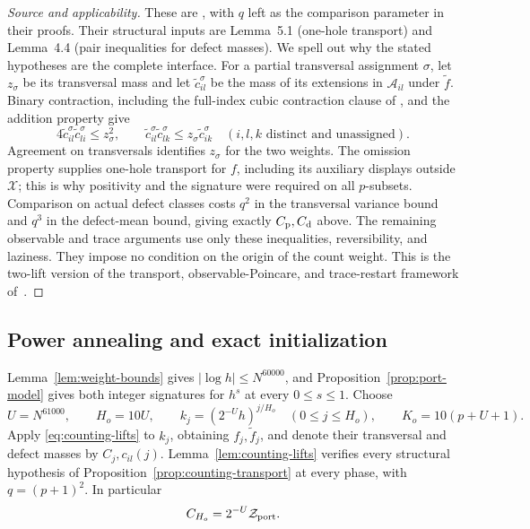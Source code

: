 \begin{proof}[Source and applicability]
These are \cite[Propositions~5.2 and~5.4 and Lemmas~5.5--5.6]{CB},
with $q$ left as the comparison parameter in their proofs.  Their
structural inputs are Lemma~5.1 (one-hole transport) and Lemma~4.4
(pair inequalities for defect masses).  We spell out why the stated
hypotheses are the complete interface.  For a partial transversal
assignment $\sigma$, let $z_\sigma$ be its transversal mass and let
$\widetilde c_{il}^{\sigma}$ be the mass of its extensions in
$\mathcal A_{il}$ under $\widetilde f$.  Binary contraction, including
the full-index cubic contraction clause of \cite[Lemma~4.1]{CB},
and the addition property give
\[
 4\widetilde c_{il}^{\sigma}\widetilde c_{li}^{\sigma}\leq z_\sigma^2,
 \qquad
 \widetilde c_{il}^{\sigma}\widetilde c_{lk}^{\sigma}
       \leq z_\sigma\widetilde c_{ik}^{\sigma}
 \quad(i,l,k\text{ distinct and unassigned}).
\]
Agreement on transversals identifies $z_\sigma$ for the two weights.
The omission property supplies one-hole transport for $f$, including
its auxiliary displays outside $\mathcal X$; this is why positivity
and the signature were required on all $p$-subsets.
Comparison on actual defect classes costs $q^2$ in the transversal
variance bound and $q^3$ in the defect-mean bound, giving exactly
$C_{\rm p},C_{\rm d}$ above.  The remaining observable and trace
arguments use only these inequalities, reversibility, and laziness.
They impose no condition on the origin of the count weight.
This is the two-lift version of the transport, observable-Poincare,
and trace-restart framework of~\cite[Sections~4--6]{Parent}.
\end{proof}

\subsection{Power annealing and exact initialization}

Lemma~\ref{lem:weight-bounds} gives $|\log h|\leq N^{60000}$, and
Proposition~\ref{prop:port-model} gives both integer signatures for
$h^s$ at every $0\leq s\leq1$.
Choose
\begin{equation}
 U=N^{61000},\qquad H_o=10U,\qquad
 k_j=(2^{-U}h)^{j/H_o}\quad(0\leq j\leq H_o),
 \qquad K_o=10(p+U+1).
 \label{eq:counting-schedule}
\end{equation}
Apply \eqref{eq:counting-lifts} to $k_j$, obtaining $f_j,\widetilde f_j$,
and denote their transversal and defect masses by $C_j,c_{il}(j)$.
Lemma~\ref{lem:counting-lifts} verifies every structural hypothesis of
Proposition~\ref{prop:counting-transport} at every phase, with
$q=(p+1)^2$.  In particular
\begin{equation}
 C_{H_o}=2^{-U}\mathcal Z_{\rm port}.
 \label{eq:counting-final-scale}
\end{equation}

